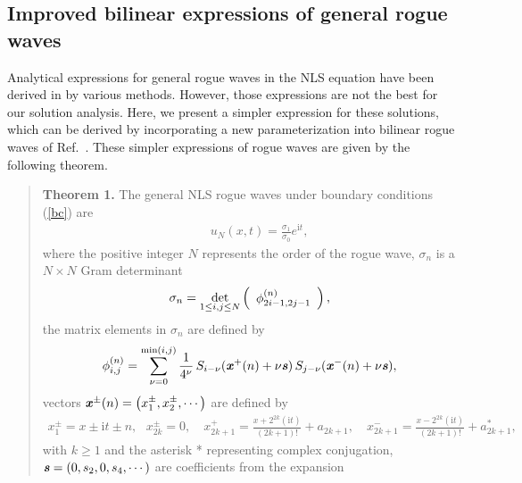 \documentclass[amsmath,amssymb]{revtex4}
\begin{document}
\subsection{Improved bilinear expressions of general rogue waves} \label{sec:solution}
Analytical expressions for general rogue waves in the NLS equation have been derived in \cite{DGKM2010,GLML2012,OhtaJY2012} by various methods. However, those expressions are not the best for our solution analysis. Here, we present a simpler expression for these solutions, which can be derived by incorporating a new parameterization \cite{YangDNLS2019} into bilinear rogue waves of Ref.~\cite{OhtaJY2012}. These simpler expressions of rogue waves are given by the following theorem.
\begin{quote}
\textbf{Theorem 1.} The general NLS rogue waves under boundary conditions (\ref{bc}) are
\begin{eqnarray}
&& u_N(x,t)=\frac{\sigma_{1}}{\sigma_{0}}e^{\textrm{i}t}, \label{BilinearTrans2}
\end{eqnarray}
where the positive integer $N$ represents the order of the rogue wave, $\sigma_{n}$ is a $N \times N$ Gram determinant
\begin{equation} \label{sigma_n}
\sigma_{n}=
\det_{
\begin{subarray}{l}
1\leq i, j \leq N
\end{subarray}
}
\left(
\begin{array}{c}
 \phi_{2i-1,2j-1}^{(n)}
\end{array}
\right),
\end{equation}
the matrix elements in $\sigma_{n}$ are defined by
\begin{equation}
\phi_{i,j}^{(n)}=\sum_{\nu=0}^{\min(i,j)} \frac{1}{4^{\nu}} \hspace{0.06cm} S_{i-\nu}(\textbf{\emph{x}}^{+}(n) +\nu \textbf{\emph{s}})  \hspace{0.06cm} S_{j-\nu}(\textbf{\emph{x}}^{-}(n) + \nu \textbf{\emph{s}}),
\end{equation}
vectors $\textbf{\emph{x}}^{\pm}(n)=\left( x_{1}^{\pm}, x_{2}^{\pm},\cdots \right)$ are defined by
\begin{eqnarray} \label{xpmdef}
x_{1}^{\pm}=x \pm \textrm{i} t \pm n, \ \ \ x_{2k}^{\pm} = 0, \quad x_{2k+1}^{+}= \frac{x+2^{2k} (\textrm{i} t)}{(2k+1)!} +a_{2k+1},    \quad x_{2k+1}^{-}=  \frac{x-2^{2k} (\textrm{i} t)}{(2k+1)!}+ a_{2k+1}^*,
\end{eqnarray}
with $k\ge 1$ and the asterisk * representing complex conjugation,
$\textbf{\emph{s}}=(0, s_2, 0, s_4, \cdots)$ are coefficients from the expansion

\end{quote}
\end{document}
